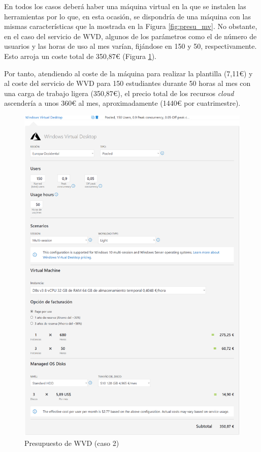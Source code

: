 En todos los casos deberá haber una máquina virtual en la que se instalen las herramientas por lo que, en esta ocasión, se dispondría de una máquina con las mismas características que la mostrada en la Figura \ref{fig:presu_mv}. No obstante, en el caso del servicio de \acs{WVD}, algunos de los parámetros como el de número de usuarios y las horas de uso al mes varían, fijándose en 150 y 50, respectivamente. Esto arroja un coste total de 350,87\euro{} (Figura \ref{fig:presu_WVD2}).

Por tanto, atendiendo al coste de la máquina para realizar la plantilla (7,11\euro{}) y al coste del servicio de \acs{WVD} para 150 estudiantes durante 50 horas al mes con una carga de trabajo ligera (350,87\euro{}), el precio total de los recursos \textit{cloud} ascendería a unos 360\euro{} al mes, aproximadamente (1440\euro{} por cuatrimestre).

\begin{figure}[h]
  \centering
  \includegraphics[width=0.9\linewidth]{figures/images/presupuesto/presu_wvd2.png}
  \caption{Presupuesto de \acs{WVD} (caso 2)}
  \label{fig:presu_WVD2}
\end{figure}

